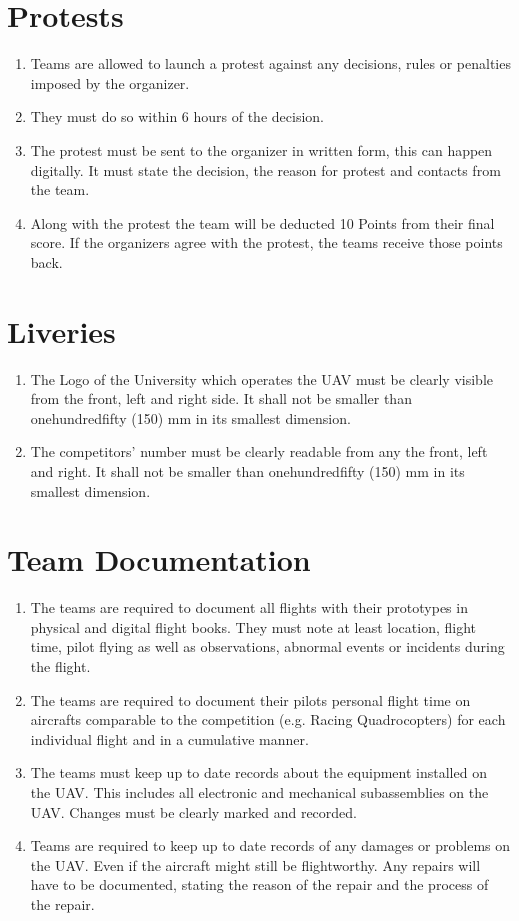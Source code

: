     \section{Protests}
    \begin{enumerate}
      \item Teams are allowed to launch a protest against any decisions, rules or penalties imposed by the organizer.
      \item They must do so within 6 hours of the decision. 
      \item The protest must be sent to the organizer in written form, this can happen digitally. It must state the decision, the reason for protest and contacts from the team.
      \item Along with the protest the team will be deducted 10 Points from their final score. If the organizers agree with the protest, the teams receive those points back. 
    \end{enumerate}

    \section{Liveries}
    \begin{enumerate}
      \item The Logo of the University which operates the UAV must be clearly visible from the front, left and right side. It shall not be smaller than onehundredfifty (150) mm in its smallest dimension.
      \item The competitors' number must be clearly readable from any the front, left and right. It shall not be smaller than onehundredfifty (150) mm in its smallest dimension.
    \end{enumerate}

    \section{Team Documentation}
    \begin{enumerate}
      \item The teams are required to document all flights with their prototypes in physical and digital flight books. They must note at least location, flight time, pilot flying 
      as well as observations, abnormal events or incidents during the flight.
      \item The teams are required to document their pilots personal flight time on aircrafts comparable to the competition (e.g. Racing Quadrocopters)
      for each individual flight and in a cumulative manner. 
      \item The teams must keep up to date records about the equipment installed on the UAV. This includes all electronic and mechanical subassemblies on the UAV. 
      Changes must be clearly marked and recorded. 
      \item Teams are required to keep up to date records of any damages or problems on the UAV. Even if the aircraft might still be flightworthy. 
      Any repairs will have to be documented, stating the reason of the repair and the process of the repair. 
    \end{enumerate}

